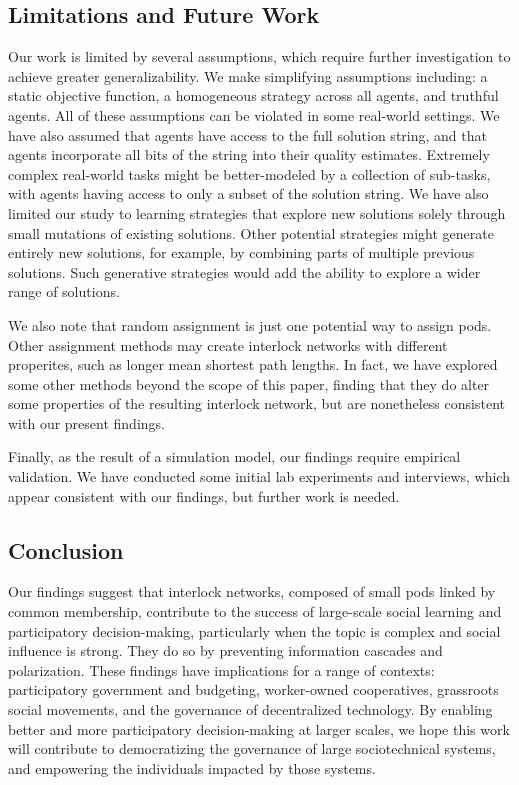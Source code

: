 \documentclass[manuscript,screen,review,acmsmall]{acmart}
\begin{document}
\subsection{Limitations and Future Work}
Our work is limited by several assumptions, which require further investigation to achieve greater generalizability.
We make simplifying assumptions including: a static objective function, a homogeneous strategy across all agents, and truthful agents.
All of these assumptions can be violated in some real-world settings.
We have also assumed that agents have access to the full solution string, and that agents incorporate all bits of the string into their quality estimates.
Extremely complex real-world tasks might be better-modeled by a collection of sub-tasks, with agents having access to only a subset of the solution string.
We have also limited our study to learning strategies that explore new solutions solely through small mutations of existing solutions.
Other potential strategies might generate entirely new solutions, for example, by combining parts of multiple previous solutions.
Such generative strategies would add the ability to explore a wider range of solutions. 

We also note that random assignment is just one potential way to assign pods.
Other assignment methods may create interlock networks with different properites,
such as longer mean shortest path lengths.
In fact, we have explored some other methods beyond the scope of this paper,
finding that they do alter some properties of the resulting interlock network,
but are nonetheless consistent with our present findings.

Finally, as the result of a simulation model, our findings require empirical validation.
We have conducted some initial lab experiments and interviews, which appear consistent with our findings, but further work is needed.

\subsection{Conclusion}
Our findings suggest that interlock networks, composed of small pods linked by common membership, contribute to the success of large-scale social learning and participatory decision-making, particularly when the topic is complex and social influence is strong. They do so by preventing information cascades and polarization.
These findings have implications for a range of contexts: participatory government and budgeting, worker-owned cooperatives, grassroots social movements, and the governance of decentralized technology. By enabling better and more participatory decision-making at larger scales, we hope this work will contribute to democratizing the governance of large sociotechnical systems, and empowering the individuals impacted by those systems.
\end{document}
